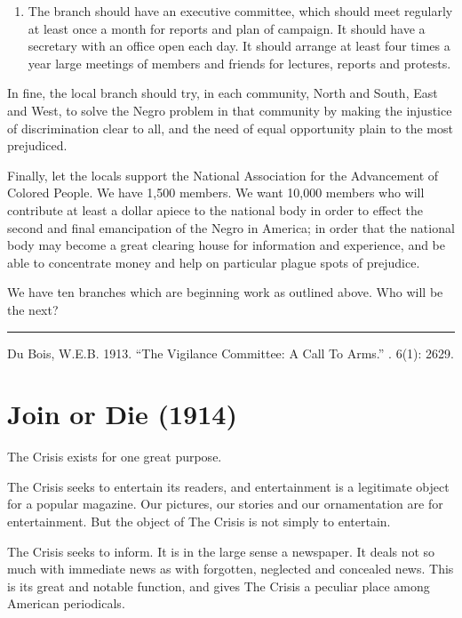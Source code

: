 \documentclass[letterpaper,10pt,english]{jupyterBook}
\begin{document}
\begin{enumerate}
\item {} 
\sphinxAtStartPar
{} The branch should have an executive committee, which should meet regularly at least once a month for reports and plan of campaign. It should have a secretary with an office open each day. It should arrange at least four times a year large meetings of members and friends for lectures, reports and protests.

\end{enumerate}

\sphinxAtStartPar
In fine, the local branch should try, in each community, North and South, East and West, to solve the Negro problem in that community by making the injustice of discrimination clear to all, and the need of equal opportunity plain to the most prejudiced.

\sphinxAtStartPar
Finally, let the locals support the National Association for the Advancement of Colored People. We have 1,500 members. We want 10,000 members who will contribute at least a dollar apiece to the national body in order to effect the second and final emancipation of the Negro in America; in order that the national body may become a great clearing house for information and experience, and be able to concentrate money and help on particular plague spots of prejudice.

\sphinxAtStartPar
We have ten branches which are beginning work as outlined above. Who will be the next?


\bigskip\hrule\bigskip


\sphinxAtStartPar
{} Du Bois, W.E.B. 1913. “The Vigilance Committee: A Call To Arms.” . 6(1): 26\sphinxhyphen{}29.


\section{Join or Die (1914)}
\label{\detokenize{Volumes/07/03/fightordie:join-or-die-1914}}\label{\detokenize{Volumes/07/03/fightordie::doc}}
\sphinxAtStartPar
The Crisis exists for one great purpose.

\sphinxAtStartPar
The Crisis seeks to entertain its readers, and entertainment is a legitimate object for a popular magazine. Our pictures, our stories and our ornamentation are for entertainment. But the object of The Crisis is not simply to entertain.

\sphinxAtStartPar
The Crisis seeks to inform. It is in the large sense a newspaper. It deals not so much with immediate news as with forgotten, neglected and concealed news. This is its great and notable
function, and gives The Crisis a peculiar place among American periodicals.
\end{document}
